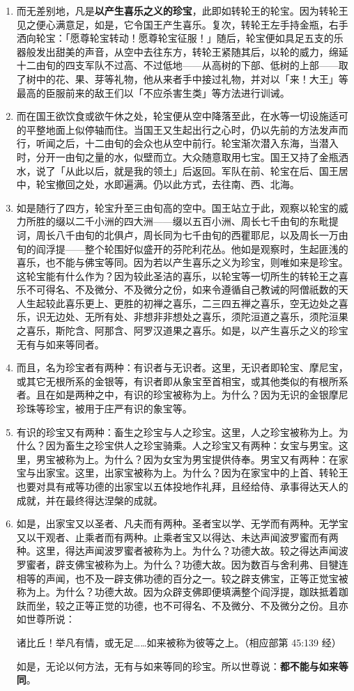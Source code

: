 \begin{enumerate}
\item 而无差别地，凡是\textbf{以产生喜乐之义的珍宝}，此即如转轮王的轮宝。因为转轮王见之便心满意足，如是，它令国王产生喜乐。复次，转轮王左手持金瓶，右手洒向轮宝：「愿尊轮宝转动！愿尊轮宝征服！」随后，轮宝便如具足五支的乐器般发出甜美的声音，从空中去往东方，转轮王紧随其后，以轮的威力，绵延十二由旬的四支军队不过高、不过低地——从高树的下部、低树的上部——取了树中的花、果、芽等礼物，他从来者手中接过礼物，并对以「来！大王」等最高的臣服前来的敌王们以「不应杀害生类」等方法进行训诫。
\item 而在国王欲饮食或欲午休之处，轮宝便从空中降落至此，在水等一切设施适可的平整地面上似停轴而住。当国王又生起出行之心时，仍以先前的方法发声而行，听闻之后，十二由旬的会众也从空中前行。轮宝渐次潜入东海，当潜入时，分开一由旬之量的水，似壁而立。大众随意取用七宝。国王又持了金瓶洒水，说了「从此以后，就是我的领土」后返回。军队在前、轮宝在后、国王居中，轮宝撤回之处，水即遍满。仍以此方式，去往南、西、北海。
\item 如是随行了四方，轮宝升至三由旬高的空中。国王站立于此，观察以轮宝的威力所胜的缀以二千小洲的四大洲——缀以五百小洲、周长七千由旬的东毗提诃，周长八千由旬的北俱卢，周长同为七千由旬的西瞿耶尼，以及周长一万由旬的阎浮提——整个轮围好似盛开的芬陀利花丛。他如是观察时，生起匪浅的喜乐，也不能与佛宝等同。因为若以产生喜乐之义为珍宝，则唯如来是珍宝。这轮宝能有什么作为？因为较此圣洁的喜乐，以轮宝等一切所生的转轮王之喜乐不可得名、不及微分、不及微分之份，如来令遵循自己教诫的阿僧祇数的天人生起较此喜乐更上、更胜的初禅之喜乐，二三四五禅之喜乐，空无边处之喜乐，识无边处、无所有处、非想非非想处之喜乐，须陀洹道之喜乐，须陀洹果之喜乐，斯陀含、阿那含、阿罗汉道果之喜乐。如是，以产生喜乐之义的珍宝无有与如来等同者。
\item 而且，名为珍宝者有两种：有识者与无识者。这里，无识者即轮宝、摩尼宝，或其它无根所系的金银等，有识者即从象宝至首相宝，或其他类似的有根所系者。且在如是两种之中，有识的珍宝被称为上。为什么？因为无识的金银摩尼珍珠等珍宝，被用于庄严有识的象宝等。
\item 有识的珍宝又有两种：畜生之珍宝与人之珍宝。这里，人之珍宝被称为上。为什么？因为畜生之珍宝供人之珍宝骑乘。人之珍宝又有两种：女宝与男宝。这里，男宝被称为上。为什么？因为女宝为男宝提供侍奉。男宝又有两种：在家宝与出家宝。这里，出家宝被称为上。为什么？因为在家宝中的上首、转轮王也要对具有戒等功德的出家宝以五体投地作礼拜，且经给侍、承事得达天人的成就，并在最终得达涅槃的成就。
\item 如是，出家宝又以圣者、凡夫而有两种。圣者宝以学、无学而有两种。无学宝又以干观者、止乘者而有两种。止乘者宝又以得达、未达声闻波罗蜜而有两种。这里，得达声闻波罗蜜者被称为上。为什么？功德大故。较之得达声闻波罗蜜者，辟支佛宝被称为上。为什么？功德大故。因为数百与舍利弗、目犍连相等的声闻，也不及一辟支佛功德的百分之一。较之辟支佛宝，正等正觉宝被称为上。为什么？功德大故。因为众辟支佛即便填满整个阎浮提，跏趺抵着跏趺而坐，较之正等正觉的功德，也不可得名、不及微分、不及微分之份。且亦如世尊所说：\begin{quoting}诸比丘！举凡有情，或无足……如来被称为彼等之上。（相应部第 45:139 经）\end{quoting}如是，无论以何方法，无有与如来等同的珍宝。所以世尊说：\textbf{都不能与如来等同}。

\end{enumerate}
